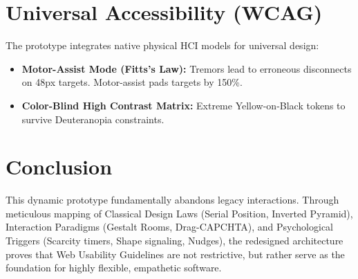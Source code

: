 \documentclass[12pt,a4paper]{article}
\begin{document}
\section{Universal Accessibility (WCAG)}
The prototype integrates native physical HCI models for universal design:
\begin{itemize}
    \item \textbf{Motor-Assist Mode (Fitts's Law):} Tremors lead to erroneous disconnects on 48px targets. Motor-assist pads targets by 150\%.
    \item \textbf{Color-Blind High Contrast Matrix:} Extreme Yellow-on-Black tokens to survive Deuteranopia constraints.
\end{itemize}

\section{Conclusion}
This dynamic prototype fundamentally abandons legacy interactions. Through meticulous mapping of Classical Design Laws (Serial Position, Inverted Pyramid), Interaction Paradigms (Gestalt Rooms, Drag-CAPCHTA), and Psychological Triggers (Scarcity timers, Shape signaling, Nudges), the redesigned architecture proves that Web Usability Guidelines are not restrictive, but rather serve as the foundation for highly flexible, empathetic software.
\end{document}
